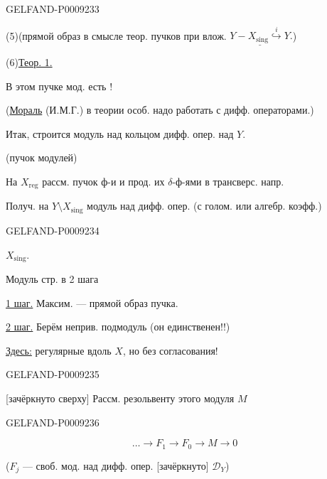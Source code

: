 \begin{GelfandAdjacentEvidence}{GELFAND-P000923}{3}


(5)\quad (прямой образ в смысле теор. пучков при влож. $\underline{Y-X_{\mathrm{sing}}\overset{i}{\hookrightarrow}Y}.$)

(6)\quad \underline{Теор. 1.}

В этом пучке мод. есть !

(\underline{Мораль} (И.М.Г.) в теории особ. надо работать с дифф. операторами.)

Итак, строится модуль над кольцом дифф. опер. над $Y$.

(пучок модулей)

На $X_{\mathrm{reg}}$ рассм. пучок ф-и и прод. их $\delta$-ф-ями в трансверс. напр.

Получ. на $Y\setminus X_{\mathrm{sing}}$ модуль над дифф. опер. (с голом. или алгебр. коэфф.)
\end{GelfandAdjacentEvidence}
\begin{GelfandAdjacentEvidence}{GELFAND-P000923}{4}


 $X_{\mathrm{sing}}$.

Модуль стр. в 2 шага

\underline{1 шаг.} Максим. --- прямой образ пучка.

\underline{2 шаг.} Берём неприв. подмодуль (он единственен!!)

\underline{Здесь:} регулярные вдоль $X$, но без согласования!
\end{GelfandAdjacentEvidence}
\begin{GelfandAdjacentEvidence}{GELFAND-P000923}{5}


[зачёркнуто сверху] Рассм. резольвенту этого модуля $M$
\end{GelfandAdjacentEvidence}
\begin{GelfandAdjacentEvidence}{GELFAND-P000923}{6}

\begin{equation*}
 \ldots\longrightarrow F_1\longrightarrow F_0\longrightarrow M\longrightarrow0
 \tag{7}
\end{equation*}

($F_j$ --- своб. мод. над дифф. опер. [зачёркнуто] $\mathcal D_Y$)
\end{GelfandAdjacentEvidence}


